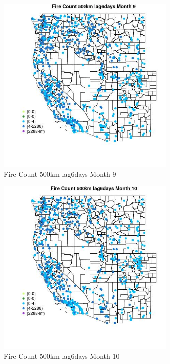 \begin{figure} 
\centering  
\includegraphics[width=0.77\textwidth]{Code_Outputs/Report_ML_input_PM25_Step4_part_e_de_duplicated_aves_compiled_2019-05-21wNAs_MapObsMo9Fire_Count_500km_lag6days.jpg} 
\caption{\label{fig:Report_ML_input_PM25_Step4_part_e_de_duplicated_aves_compiled_2019-05-21wNAsMapObsMo9Fire_Count_500km_lag6days}Fire Count 500km lag6days Month 9} 
\end{figure} 
 

\begin{figure} 
\centering  
\includegraphics[width=0.77\textwidth]{Code_Outputs/Report_ML_input_PM25_Step4_part_e_de_duplicated_aves_compiled_2019-05-21wNAs_MapObsMo10Fire_Count_500km_lag6days.jpg} 
\caption{\label{fig:Report_ML_input_PM25_Step4_part_e_de_duplicated_aves_compiled_2019-05-21wNAsMapObsMo10Fire_Count_500km_lag6days}Fire Count 500km lag6days Month 10} 
\end{figure} 
 

